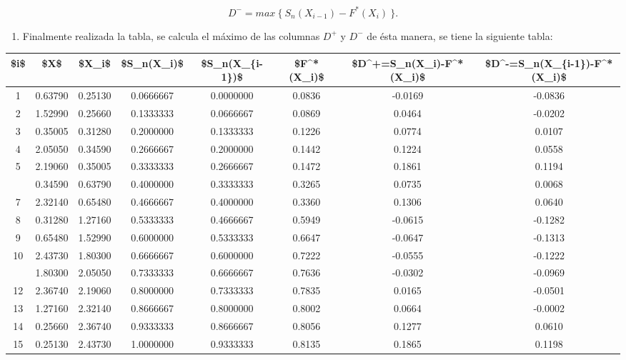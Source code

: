 \documentclass[
  a4paper,
  oneside,
  openany]{book}
\providecommand{\tightlist}{%
  \setlength{\itemsep}{0pt}\setlength{\parskip}{0pt}}
\begin{document}
\[D^-= max \ \{\ S_{n}(X_{i-1})-F^*(X_{i}) \ \}.\]

\begin{enumerate}
\def\labelenumi{\arabic{enumi})}
\setcounter{enumi}{6}
\tightlist
\item
  Finalmente realizada la tabla, se calcula el máximo de las columnas \(D^+\) y \(D^-\) de ésta manera, se tiene la siguiente tabla:
\end{enumerate}

\begin{table}
\centering
\begin{tabular}{cccccccc}
\toprule
\$i\$ & \$X\$ & \$X\_i\$ & \$S\_n(X\_i)\$ & \$S\_n(X\_\{i-1\})\$ & \$F\textasciicircum{}*(X\_i)\$ & \$D\textasciicircum{}+=S\_n(X\_i)-F\textasciicircum{}*(X\_i)\$ & \$D\textasciicircum{}-=S\_n(X\_\{i-1\})-F\textasciicircum{}*(X\_i)\$\\
\midrule
1 & 0.63790 & 0.25130 & 0.0666667 & 0.0000000 & 0.0836 & -0.0169 & -0.0836\\
2 & 1.52990 & 0.25660 & 0.1333333 & 0.0666667 & 0.0869 & 0.0464 & -0.0202\\
3 & 0.35005 & 0.31280 & 0.2000000 & 0.1333333 & 0.1226 & 0.0774 & 0.0107\\
4 & 2.05050 & 0.34590 & 0.2666667 & 0.2000000 & 0.1442 & 0.1224 & 0.0558\\
5 & 2.19060 & 0.35005 & 0.3333333 & 0.2666667 & 0.1472 & 0.1861 & 0.1194\\
\addlinespace
6 & 0.34590 & 0.63790 & 0.4000000 & 0.3333333 & 0.3265 & 0.0735 & 0.0068\\
7 & 2.32140 & 0.65480 & 0.4666667 & 0.4000000 & 0.3360 & 0.1306 & 0.0640\\
8 & 0.31280 & 1.27160 & 0.5333333 & 0.4666667 & 0.5949 & -0.0615 & -0.1282\\
9 & 0.65480 & 1.52990 & 0.6000000 & 0.5333333 & 0.6647 & -0.0647 & -0.1313\\
10 & 2.43730 & 1.80300 & 0.6666667 & 0.6000000 & 0.7222 & -0.0555 & -0.1222\\
\addlinespace
11 & 1.80300 & 2.05050 & 0.7333333 & 0.6666667 & 0.7636 & -0.0302 & -0.0969\\
12 & 2.36740 & 2.19060 & 0.8000000 & 0.7333333 & 0.7835 & 0.0165 & -0.0501\\
13 & 1.27160 & 2.32140 & 0.8666667 & 0.8000000 & 0.8002 & 0.0664 & -0.0002\\
14 & 0.25660 & 2.36740 & 0.9333333 & 0.8666667 & 0.8056 & 0.1277 & 0.0610\\
15 & 0.25130 & 2.43730 & 1.0000000 & 0.9333333 & 0.8135 & 0.1865 & 0.1198\\
\bottomrule
\end{tabular}
\end{table}
\end{document}
